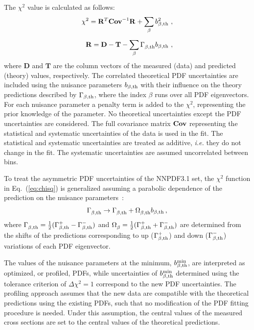 \documentclass[pdftex,twocolumn,epjc3]{svjour3}          %
\newcommand{\nnpdf} {NNPDF3.1\xspace}
\newcommand{\chisq}{\ensuremath{\chi^2}\xspace}
\begin{document}
The \chisq value is calculated as follows:
\begin{equation}
\begin{split}
  \chisq = \mathbf{R}^{T}_{} \mathbf{Cov}^{-1}_{} \mathbf{R}_{} + \sum_{\beta} b_{\beta,\rm th}^2 \ , \\[5pt]
  \mathbf{R} = \mathbf{D} - \mathbf{T} - \sum_{\beta} \Gamma^{}_{\beta,\rm th} b_{\beta,\rm th} \ ,
\label{eq:chisq}
\end{split}
\end{equation}
%
where $\mathbf{D}$ and $\mathbf{T}$ are the column vectors of the
measured (data) and predicted (theory) values, respectively.  The
correlated theoretical PDF uncertainties are included using the
nuisance parameters $b_{\beta, \rm th}$ with their influence on the
theory predictions described by $\Gamma_{\beta,\rm th}$, where the
index $\beta$ runs over all PDF eigenvectors. For each nuisance
parameter a penalty term is added to the \chisq, representing the
prior knowledge of the parameter. No theoretical uncertainties except
the PDF uncertainties are considered. The full covariance matrix ${\bf Cov }$
representing the statistical and systematic uncertainties of the data
is used in the fit. The statistical and systematic uncertainties are
treated as additive, \textit{i.e.} they do not change in the fit. The
systematic uncertainties are assumed uncorrelated between bins.

To treat the asymmetric PDF uncertainties of the \nnpdf set, the
\chisq function in Eq.~(\ref{eq:chisq}) is generalized assuming a
parabolic dependence of the prediction on the nuisance
parameters~\cite{Alekhin:2014irh}:
\begin{eqnarray}
\Gamma^{}_{\beta, \rm th} \to \Gamma^{}_{\beta, \rm th} +  \Omega^{}_{\beta, \rm th}b_{\beta, \rm th}\,, \label{eq:iter}
\end{eqnarray}
where
$\Gamma^{}_{\beta, \rm th} = \frac12(\Gamma^{+}_{\beta, \rm th} -
\Gamma^{-}_{\beta, \rm th})$
and
$\Omega^{}_{\beta} = \frac12 (\Gamma^{+}_{\beta, \rm th} +
\Gamma^{-}_{\beta, \rm th})$
are determined from the shifts of the predictions corresponding to up
($\Gamma^{+}_{\beta, \rm th}$) and down
($ \Gamma^{-}_{\beta, \rm th}$) variations of each PDF eigenvector.

The values of the nuisance parameters at the minimum,
$b^{\rm min}_{\beta,\rm th}$, are interpreted as optimized, or
profiled, PDFs, while  uncertainties of $b^{\rm min}_{\beta,\rm th}$   determined using the
tolerance criterion of $\Delta\chi^2 = 1$ correspond to the new PDF
uncertainties. The profiling approach assumes that the new data are
compatible with the theoretical predictions using the existing PDFs,
such that no modification of the PDF fitting procedure is
needed. Under this assumption, the central values of the measured
cross sections are set to the central values of the theoretical
predictions.
\end{document}
